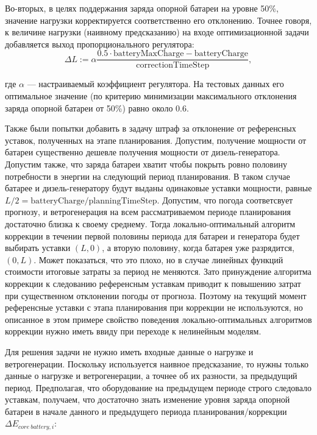         Во-вторых, в целях поддержания заряда опорной батареи на уровне 50\%, значение нагрузки корректируется соответственно его отклонению.
        Точнее говоря, к величине нагрузки (наивному предсказанию) на входе оптимизационной задачи добавляется выход пропорционального регулятора: 
        \begin{equation}
        \label{f:dL}
        \Delta L := \alpha \frac{0.5 \cdot  \text{batteryMaxCharge} -
        \text{batteryCharge}}{\text{correctionTimeStep}},
        \end{equation}
        
        где $\alpha$ --- настраиваемый коэффициент регулятора.
        На тестовых данных его оптимальное значение (по критерию минимизации максимального отклонения заряда опорной батареи от 50\%) равно около $0.6$.
        
        Также были попытки добавить в задачу штраф за отклонение от референсных уставок, полученных на этапе планирования.
        Допустим, получение мощности от батареи существенно дешевле получения мощности от дизель-генератора. Допустим также, что заряда батареи хватит чтобы покрыть ровно половину потребности в энергии на следующий период планирования.
        В таком случае батарее и дизель-генератору будут выданы одинаковые уставки мощности, равные
        $L/2 = \text{batteryCharge} / \text{planningTimeStep}$.
        Допустим, что погода соответсвует прогнозу, и ветрогенерация на всем рассматриваемом периоде планирования достаточно близка к своему среднему.
        Тогда локально-оптимальный алгоритм коррекции в течении первой половины периода для батареи и генератора будет выбирать уставки $(L, 0)$, а вторую половину, когда батарея уже разрядится, $(0, L)$.
        Может показаться, что это плохо, но в случае линейных функций стоимости итоговые затраты за период не меняются. 
        Зато принуждение алгоритма коррекции к следованию референсным уставкам приводит к повышению затрат при существенном отклонении погоды от прогноза. 
        Поэтому на текущий момент референсные уставки с этапа планирования при коррекции не используются, но описанное в этом примере свойство поведения локально-оптимальных алгоритмов коррекции нужно иметь ввиду при переходе к нелинейным моделям.
        
        Для решения задачи не нужно иметь входные данные о нагрузке и ветрогенерации.
        Поскольку используется наивное предсказание, то нужны только данные о нагрузке и ветрогенерации, а точнее об их разности, за предыдущий период.
        Предполагая, что оборудование на предыдущем периоде строго следовало уставкам, получаем, что достаточно знать изменение  уровня заряда опорной батареи в начале данного и предыдущего периода планирования/коррекции 
        $\Delta E_{core~battery, i}$:
        

